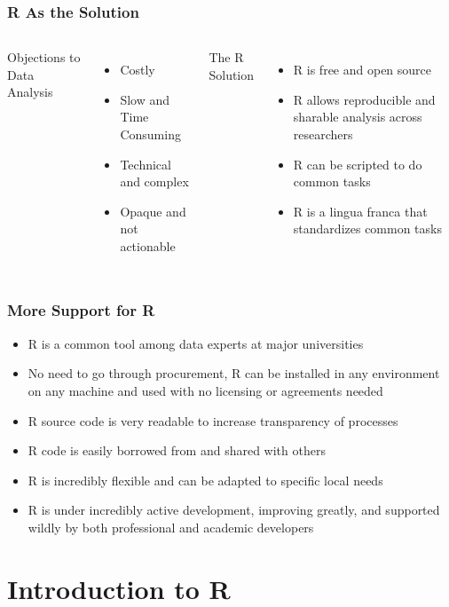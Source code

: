 \documentclass[12pt,handout]{beamer}
\begin{document}
\begin{frame}
\frametitle{R As the Solution}
  \begin{columns}
  Objections to Data Analysis
  \begin{itemize}
  \item Costly
  \item Slow and Time Consuming
  \item Technical and complex
  \item Opaque and not actionable
  \end{itemize}
  The R Solution
  \begin{itemize}
  \item R is free and open source
  \item R allows reproducible and sharable analysis across researchers
  \item R can be scripted to do common tasks
  \item R is a lingua franca that standardizes common tasks
  \end{itemize}
  \end{columns}
\end{frame}

\begin{frame}
\frametitle{More Support for R}
  \begin{itemize}
  \item R is a common tool among data experts at major universities
  \item No need to go through procurement, R can be installed in any environment on any machine and used with no licensing or agreements needed
  \item R source code is very readable to increase transparency of processes
  \item R code is easily borrowed from and shared with others
  \item R is incredibly flexible and can be adapted to specific local needs
  \item R is under incredibly active development, improving greatly, and supported wildly by both professional and academic developers
  \end{itemize}
\end{frame}


\section{Introduction to R}
\label{sec:intro-r}
\end{document}
